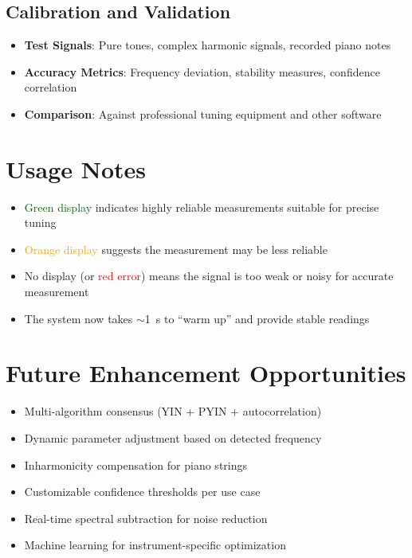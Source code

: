 \documentclass[11pt,a4paper]{article}
\begin{document}
\subsection{Calibration and Validation}
\begin{itemize}
    \item \textbf{Test Signals}: Pure tones, complex harmonic signals, recorded piano notes
    \item \textbf{Accuracy Metrics}: Frequency deviation, stability measures, confidence correlation
    \item \textbf{Comparison}: Against professional tuning equipment and other software
\end{itemize}

\section{Usage Notes}

\begin{itemize}
    \item \textcolor{darkgreen}{Green display} indicates highly reliable measurements suitable for precise tuning
    \item \textcolor{orange}{Orange display} suggests the measurement may be less reliable
    \item No display (or \textcolor{red}{red error}) means the signal is too weak or noisy for accurate measurement
    \item The system now takes $\sim$\SI{1}{\second} to ``warm up'' and provide stable readings
\end{itemize}

\section{Future Enhancement Opportunities}

\begin{itemize}
    \item Multi-algorithm consensus (YIN + PYIN + autocorrelation)
    \item Dynamic parameter adjustment based on detected frequency
    \item Inharmonicity compensation for piano strings
    \item Customizable confidence thresholds per use case
    \item Real-time spectral subtraction for noise reduction
    \item Machine learning for instrument-specific optimization
\end{itemize}
\end{document}

